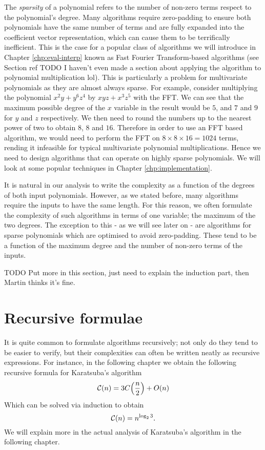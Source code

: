 The \emph{sparsity} of a polynomial refers to the number of non-zero terms respect to the polynomial's degree. Many algorithms require zero-padding to ensure both polynomials have the same number of terms and are fully expanded into the coefficient vector representation, which can cause them to be terrifically inefficient. This is the case for a popular class of algorithms we will introduce in Chapter \ref{chp:eval-interp} known as Fast Fourier Transform-based algorithms (see Section ref TODO I haven't even made a section about applying the algorithm to polynomial multiplication lol). This is particularly a problem for multivariate polynomials as they are almost always sparse. For example, consider multiplying the polynomial $x^2y + y^6z^4$ by $xyz + x^3z^5$ with the FFT. We can see that the maximum possible degree of the $x$ variable in the result would be $5$, and $7$ and $9$ for $y$ and $z$ respectively. We then need to round the numbers up to the nearest power of two to obtain $8$, $8$ and $16$. Therefore in order to use an FFT based algorithm, we would need to perform the FFT on $8 \times 8 \times 16 = 1024$ terms, rending it infeasible for typical multivariate polynomial multiplications. Hence we need to design algorithms that can operate on highly sparse polynomials. We will look at some popular techniques in Chapter \ref{chp:implementation}.

It is natural in our analysis to write the complexity as a function of the degrees of both input polynomials. However, as we stated before, many algorithms require the inputs to have the same length. For this reason, we often formulate the complexity of such algorithms in terms of one variable; the maximum of the two degrees. The exception to this - as we will see later on - are algorithms for sparse polynomials which are optimised to avoid zero-padding. These tend to be a function of the maximum degree and the number of non-zero terms of the inputs.

TODO Put more in this section, just need to explain the induction part, then Martin thinks it's fine.

\section{Recursive formulae}%
\label{sec:Recursive forumulae}

It is quite common to formulate algorithms recursively; not only do they tend to be easier to verify, but their complexities can often be written neatly as recursive expressions. For instance, in the following chapter we obtain the following recursive formula for Karatsuba's algorithm
\[
    \M{C}(n) = 3C\bb{\frac{n}{2}} + O(n)
\]
Which can be solved via induction to obtain
\[
    \mathcal C(n) =  n^{\log_2 3}.
\]
We will explain more in the actual analysis of Karatsuba's algorithm in the following chapter.
